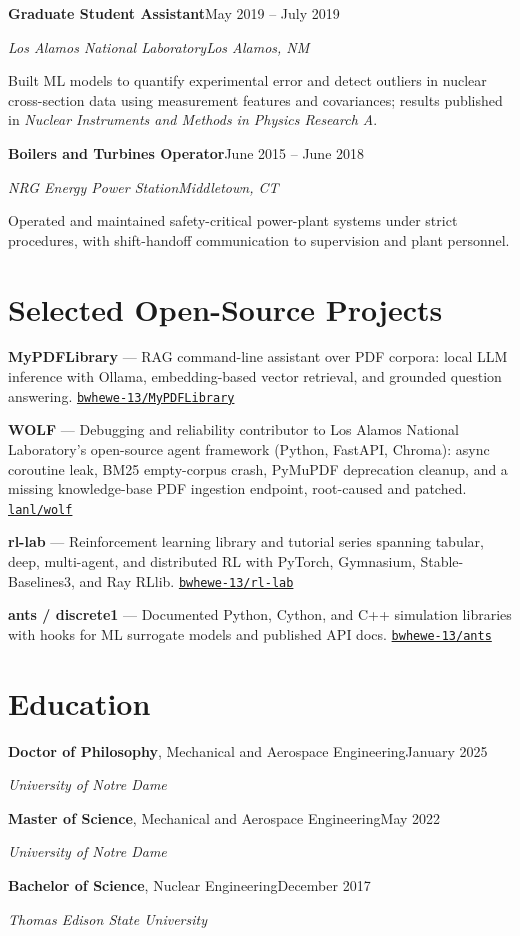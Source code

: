 \documentclass[10.5pt,letterpaper]{article}
\newcommand{\role}[4]{%
  \vspace{3pt}%
  \noindent\textbf{#1}\hfill\textcolor{muted}{#2}\par
  \noindent\textit{#3}\hfill\textcolor{muted}{\textit{#4}}\par
  \vspace{1pt}%
}
\newcommand{\degree}[4]{%
  \noindent\textbf{#1}, #2\hfill\textcolor{muted}{#4}\par
  \noindent\textit{#3}\par\vspace{2pt}%
}
\newcommand{\project}[4]{\noindent\textbf{#1} --- #2 \href{#3}{\small\texttt{#4}}\par\vspace{1.5pt}}
\begin{document}
\role{Graduate Student Assistant}{May 2019 -- July 2019}{Los Alamos National Laboratory}{Los Alamos, NM}
\begin{tight}
  \item Built ML models to quantify experimental error and detect outliers in nuclear
    cross-section data using measurement features and covariances; results published in
    \textit{Nuclear Instruments and Methods in Physics Research A}.
\end{tight}

\role{Boilers and Turbines Operator}{June 2015 -- June 2018}{NRG Energy Power Station}{Middletown, CT}
\begin{tight}
  \item Operated and maintained safety-critical power-plant systems under strict procedures,
    with shift-handoff communication to supervision and plant personnel.
\end{tight}

\section{Selected Open-Source Projects}
\project{MyPDFLibrary}{RAG command-line assistant over PDF corpora: local LLM inference with Ollama,
  embedding-based vector retrieval, and grounded question answering.}{https://github.com/bwhewe-13/MyPDFLibrary}{bwhewe-13/MyPDFLibrary}
\project{WOLF}{Debugging and reliability contributor to Los Alamos National Laboratory's open-source
  agent framework (Python, FastAPI, Chroma): async coroutine leak, BM25 empty-corpus crash, PyMuPDF
  deprecation cleanup, and a missing knowledge-base PDF ingestion endpoint, root-caused and
  patched.}{https://github.com/lanl/wolf}{lanl/wolf}
\project{rl-lab}{Reinforcement learning library and tutorial series spanning tabular, deep,
  multi-agent, and distributed RL with PyTorch, Gymnasium, Stable-Baselines3, and Ray RLlib.}{https://github.com/bwhewe-13/rl-lab}{bwhewe-13/rl-lab}
\project{ants / discrete1}{Documented Python, Cython, and C++ simulation libraries with hooks for
  ML surrogate models and published API docs.}{https://github.com/bwhewe-13/ants}{bwhewe-13/ants}

\section{Education}
\degree{Doctor of Philosophy}{Mechanical and Aerospace Engineering}{University of Notre Dame}{January 2025}
\degree{Master of Science}{Mechanical and Aerospace Engineering}{University of Notre Dame}{May 2022}
\degree{Bachelor of Science}{Nuclear Engineering}{Thomas Edison State University}{December 2017}
\end{document}
